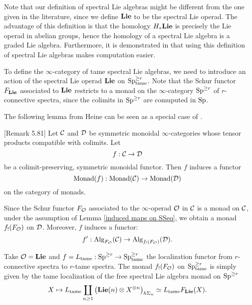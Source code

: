 \begin{remark}
Note that our definition of spectral Lie algebras might be different from the one given in the literature, since we define $\mathbf{Lie}$ to be the spectral Lie operad. 
The advantage of this definition is that the homology $H_{*}\mathbf{Lie}$ is precisely the Lie operad in abelian groups, hence the homology of a spectral Lie algebra is a graded Lie algebra. 
Furthermore, it is demonstrated in \cite{Camarena_mod2_free_spectral_Lie_algebra} that using this definition of spectral Lie algebras makes computation easier.
\end{remark}


To define the $\infty$-category of tame spectral Lie algebras, we need to introduce an action of the spectral Lie operad $\mathbf{Lie}$ on $\operatorname{Sp}^{\geq r}_{\operatorname{tame}}$.
Note that the Schur functor $F_{\mathbf{Lie}}$ associated to $\mathbf{Lie}$ restricts to a monad on the $\infty$-category $\operatorname{Sp}^{\geq r}$ of $r$-connective spectra, since the colimits in $\operatorname{Sp}^{\geq r}$ are comuputed in $\operatorname{Sp}$.

The following lemma from Heine can be seen as a special case of \cite[Remark 4.6.2.9.]{HA}.
\begin{lemma}
\label{induced maps on SSeq}
\cite{Hadrianphdthesis}[Remark 5.81]
Let ${\mathcal{C}}$ and ${\mathcal{D}}$ be symmetric monoidal $\infty$-categories whose tensor products compatible with colimits. Let
$$
f: {\mathcal{C}} \to {\mathcal{D}}
$$
be a colimit-preserving, symmetric monoidal functor.
Then $f$ induces a functor 
$$
\operatorname{Monad}(f): \operatorname{Monad}({\mathcal{C}}) \to \operatorname{Monad}({\mathcal{D}})
$$
on the category of monads.
\end{lemma}	


Since the Schur functor $F_{{\mathcal{O}}}$ associated to the $\infty$-operad ${\mathcal{O}}$ in ${\mathcal{C}}$ is a monad on ${\mathcal{C}}$, under the assumption of Lemma \ref{induced maps on SSeq}, we obtain a monad $f_{!}(F_{\mathcal{O}})$ on ${\mathcal{D}}$. Moreover, $f$ induces a functor:
\[
f' : \operatorname{Alg}_{F_{\mathcal{O}}}({\mathcal{C}}) \to \operatorname{Alg}_{f_{!}(F_{\mathcal{O}})}({\mathcal{D}}).
\]

Take ${\mathcal{O}}=\mathbf{Lie}$ and $f=L_{\operatorname{\operatorname{tame}}}:\operatorname{Sp}^{\geq r} \to \operatorname{Sp}^{\geq r}_{\operatorname{\operatorname{tame}}}$ the localization functor from $r$-connective spectra to $r$-tame spectra. The monad $f_{!}(F_{\mathcal{O}})$ on $\operatorname{Sp}^{\geq r}_{\operatorname{\operatorname{tame}}}$ is simply given by the tame localization of the free spectral Lie algebra monad on $\operatorname{Sp}^{\geq r}$
$$
X \mapsto  
L_{\operatorname{\operatorname{tame}}}
\coprod_{n\geq 1}
		\big(
		\mathbf{Lie}(n) \otimes X^{\otimes n}
		\big)_{h\Sigma_n}
		\simeq 
		L_{\operatorname{\operatorname{tame}}}F_{\mathbf{Lie}}(X).
$$


